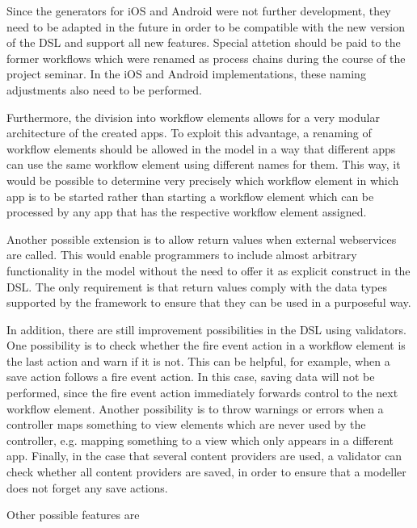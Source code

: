 

Since the generators for iOS and Android were not further development, they need to be adapted in the future in order to be compatible with the new version of the DSL and support all new features. Special attetion should be paid to the former workflows which were renamed as process chains during the course of the project seminar. In the iOS and Android implementations, these naming adjustments also need to be performed.

Furthermore, the division into workflow elements allows for a very modular architecture of the created apps. To exploit this advantage, a renaming of workflow elements should be allowed in the model in a way that different apps can use the same workflow element using different names for them. This way, it would be possible to determine very precisely which workflow element in which app is to be started rather than starting a workflow element which can be processed by any app that has the respective workflow element assigned.

Another possible extension is to allow return values when external webservices are called. This would enable programmers to include almost arbitrary functionality in the model without the need to offer it as explicit construct in the DSL. The only requirement is that return values comply with the data types supported by the \MD framework to ensure that they can be used in a purposeful way.

In addition, there are still improvement possibilities in the DSL using validators. One possibility is to check whether the fire event action in a workflow element is the last action and warn if it is not. This can be helpful, for example, when a save action follows a fire event action. In this case, saving data will not be performed, since the fire event action immediately forwards control to the next workflow element. Another possibility is to throw warnings or errors when a controller maps something to view elements which are never used by the controller, e.g. mapping something to a view which only appears in a different app. Finally, in the case that several content providers are used, a validator can check whether all content providers are saved, in order to ensure that a modeller does not forget any save actions.

Other possible features are

